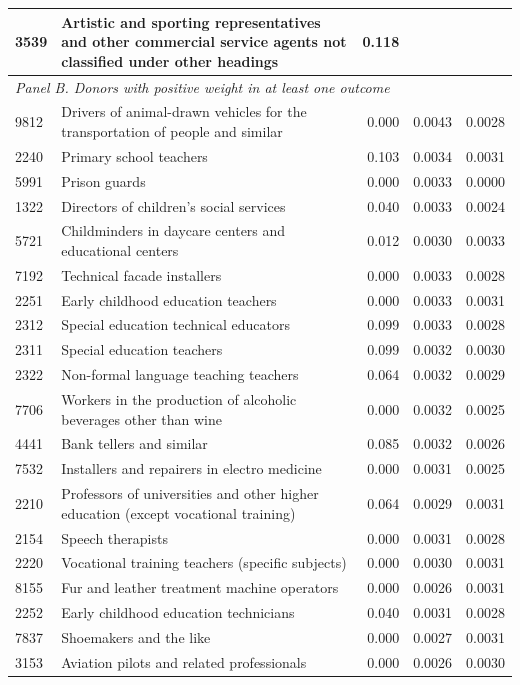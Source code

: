 \begin{longtable}{p{}>{\raggedright\arraybackslash}p{}rrr}
3539 & Artistic and sporting representatives and other commercial service agents not classified under other headings & 0.118 & & \\
\midrule
\multicolumn{5}{l}{\textit{Panel B. Donors with positive weight in at least one outcome}} \\
9812 & Drivers of animal-drawn vehicles for the transportation of people and similar & 0.000 & 0.0043 & 0.0028 \\
2240 & Primary school teachers & 0.103 & 0.0034 & 0.0031 \\
5991 & Prison guards & 0.000 & 0.0033 & 0.0000 \\
1322 & Directors of children's social services & 0.040 & 0.0033 & 0.0024 \\
5721 & Childminders in daycare centers and educational centers & 0.012 & 0.0030 & 0.0033 \\
7192 & Technical facade installers & 0.000 & 0.0033 & 0.0028 \\
2251 & Early childhood education teachers & 0.000 & 0.0033 & 0.0031 \\
2312 & Special education technical educators & 0.099 & 0.0033 & 0.0028 \\
2311 & Special education teachers & 0.099 & 0.0032 & 0.0030 \\
2322 & Non-formal language teaching teachers & 0.064 & 0.0032 & 0.0029 \\
7706 & Workers in the production of alcoholic beverages other than wine & 0.000 & 0.0032 & 0.0025 \\
4441 & Bank tellers and similar & 0.085 & 0.0032 & 0.0026 \\
7532 & Installers and repairers in electro medicine & 0.000 & 0.0031 & 0.0025 \\
2210 & Professors of universities and other higher education (except vocational training) & 0.064 & 0.0029 & 0.0031 \\
2154 & Speech therapists & 0.000 & 0.0031 & 0.0028 \\
2220 & Vocational training teachers (specific subjects) & 0.000 & 0.0030 & 0.0031 \\
8155 & Fur and leather treatment machine operators & 0.000 & 0.0026 & 0.0031 \\
2252 & Early childhood education technicians & 0.040 & 0.0031 & 0.0028 \\
7837 & Shoemakers and the like & 0.000 & 0.0027 & 0.0031 \\
3153 & Aviation pilots and related professionals & 0.000 & 0.0026 & 0.0030 \\

\end{longtable}
